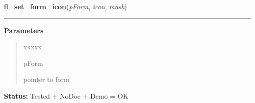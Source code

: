 \hspace{.8\funcindent}\begin{boxedminipage}{\funcwidth}

    \raggedright \textbf{fl\_set\_form\_icon}(\textit{pForm}, \textit{icon}, \textit{mask})

    \vspace{-1.5ex}

    \rule{\textwidth}{0.5\fboxrule}
\setlength{\parskip}{2ex}
\setlength{\parskip}{1ex}
      \textbf{Parameters}
      \vspace{-1ex}

      \begin{quote}
        \begin{Ventry}{xxxxx}

          \item[pForm]

          pointer to form

        \end{Ventry}

      \end{quote}

\textbf{Status:} Tested + NoDoc + Demo = OK



    \end{boxedminipage}

    \label{xformslib:library:fl_get_decoration_sizes}

    \vspace{0.5ex}

